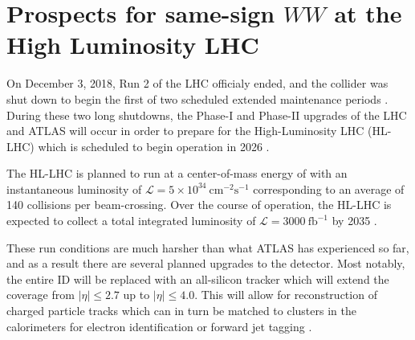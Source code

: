 \chapter[Prospects for same-sign $WW$ at the High Luminosity LHC][Prospects for same-sign $WW$ at the High Luminosity LHC]{Prospects for same-sign $WW$ at the High Luminosity LHC}
\label{ch:sswwupgrade}


On December 3, 2018, Run 2 of the LHC officialy ended, and the collider was shut down to begin the first of two scheduled extended maintenance periods \cite{2018.cern-press-run2}.
During these two long shutdowns, the Phase-I and Phase-II upgrades of the LHC and ATLAS will occur in order to prepare for the High-Luminosity LHC (HL-LHC) which is scheduled to begin operation in 2026 \cite{2011.atlas-phase1-loi}.

The HL-LHC is planned to run at a center-of-mass energy of  with an instantaneous luminosity of $\mathcal{L}=5\times 10^{34}~\textrm{cm}^{-2}\textrm{s}^{-1}$ corresponding to an average of 140 collisions per beam-crossing. 
Over the course of operation, the HL-LHC is expected to collect a total integrated luminosity of $\mathcal{L} = 3000~\mathrm{fb}^{-1}$ by 2035 \cite{2015.hllhc-design-report}.

These run conditions are much harsher than what ATLAS has experienced so far, and as a result there are several planned upgrades to the detector.
Most notably, the entire ID will be replaced with an all-silicon tracker which will extend the coverage from $|\eta| \le 2.7$ up to $|\eta| \le 4.0$.
This will allow for reconstruction of charged particle tracks which can in turn be matched to clusters in the calorimeters for electron identification or forward jet tagging \cite{2015.atlas-phase2-scoping}.

